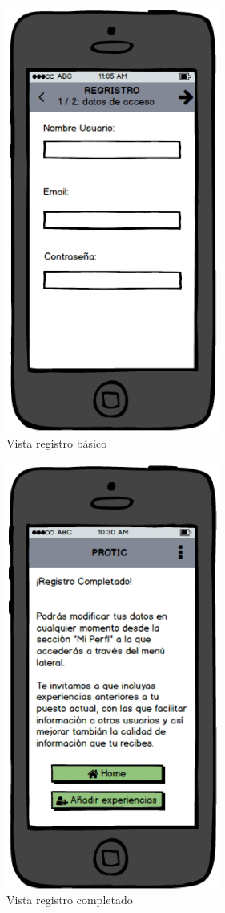 \documentclass[a4paper, 12pt]{book}
\begin{document}
    \begin{figure}
        \centering
        \includegraphics[width=7cm, keepaspectratio]{img/old_vista_registro_basico.PNG}
        \caption{Vista registro básico}
    \end{figure}

    \begin{figure}
        \centering
        \includegraphics[width=7cm, keepaspectratio]{img/old_vista_registro_completado.PNG}
        \caption{Vista registro completado}
    \end{figure}
\end{document}
